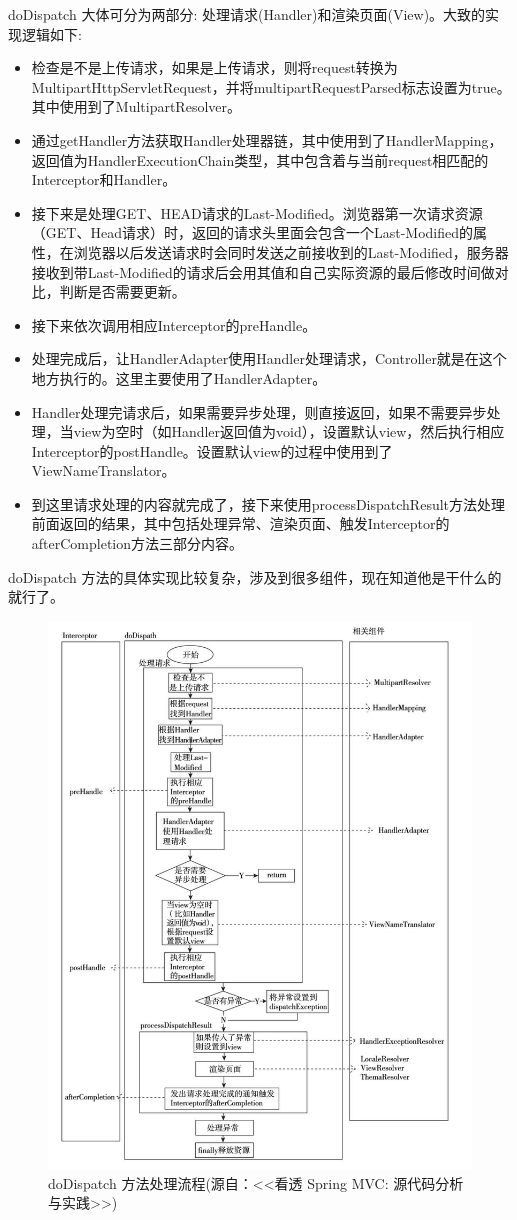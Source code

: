 doDispatch 大体可分为两部分: 处理请求(Handler)和渲染页面(View)。大致的实现逻辑如下:
\begin{itemize}
    \item 检查是不是上传请求，如果是上传请求，则将request转换为MultipartHttpServletRequest，并将multipartRequestParsed标志设置为true。其中使用到了MultipartResolver。
    \item 通过getHandler方法获取Handler处理器链，其中使用到了HandlerMapping，返回值为HandlerExecutionChain类型，其中包含着与当前request相匹配的Interceptor和Handler。
    \item 接下来是处理GET、HEAD请求的Last-Modified。浏览器第一次请求资源（GET、Head请求）时，返回的请求头里面会包含一个Last-Modified的属性，在浏览器以后发送请求时会同时发送之前接收到的Last-Modified，服务器接收到带Last-Modified的请求后会用其值和自己实际资源的最后修改时间做对比，判断是否需要更新。
    \item 接下来依次调用相应Interceptor的preHandle。
    \item 处理完成后，让HandlerAdapter使用Handler处理请求，Controller就是在这个地方执行的。这里主要使用了HandlerAdapter。
    \item Handler处理完请求后，如果需要异步处理，则直接返回，如果不需要异步处理，当view为空时（如Handler返回值为void），设置默认view，然后执行相应Interceptor的postHandle。设置默认view的过程中使用到了ViewNameTranslator。
    \item 到这里请求处理的内容就完成了，接下来使用processDispatchResult方法处理前面返回的结果，其中包括处理异常、渲染页面、触发Interceptor的afterCompletion方法三部分内容。
\end{itemize}

doDispatch 方法的具体实现比较复杂，涉及到很多组件，现在知道他是干什么的就行了。

\begin{figure}[H]
    \centering
    \includegraphics[width=0.9\linewidth]{../../imgs/uml/doDispatch.png}
    \caption{doDispatch 方法处理流程(源自：<<看透 Spring MVC: 源代码分析与实践>>)}
    \label{fig:doDispatch 方法处理流程}
\end{figure}


\newpage